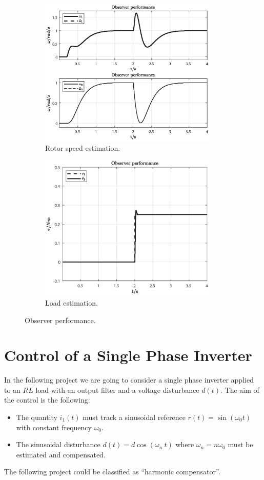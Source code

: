 \documentclass[11pt,a4paper,oneside]{book}
\numberwithin{equation}{section}
\theoremstyle{it}
\theoremstyle{definition}
\begin{document}
\begin{figure}[H]
	\centering
	\begin{subfigure}{.5\textwidth}
		\centering
		\includegraphics[width = 240pt, keepaspectratio]{figures/msm/observer_2.eps}
		\captionsetup{width=0.65\textwidth, font=footnotesize}
		\caption{Rotor speed estimation.}
		\label{figure_sim4}
	\end{subfigure}%
	\begin{subfigure}{.5\textwidth}
		\centering
		\includegraphics[width = 240pt, keepaspectratio]{figures/msm/load_obs_1.eps}
		\captionsetup{width=0.65\textwidth, font=footnotesize}
		\caption{Load estimation.}
		\label{figure_sim5}
	\end{subfigure}
	\captionsetup{width=0.5\textwidth, font=small}
	\caption{Observer performance.}
	\label{}
\end{figure}



\section{Control of a Single Phase Inverter}
In the following project we are going to consider a single phase inverter 
applied to an $RL$ load with an output filter and a voltage disturbance $d(t)$. 
The aim of the control is the following:
\begin{itemize}
	\item The quantity $i_1(t)$ must track a sinusoidal reference $r(t) = 
	\sin(\omega_0t)$ with constant frequency $\omega_0$.
	\item The sinusoidal disturbance $d(t)= d\cos(\omega_n \ t)$ where 
	$\omega_n=n\omega_0$ must be estimated and compensated.
\end{itemize}
The following project could be classified as \textquotedblleft harmonic 
compensator\textquotedblright.
\end{document}
